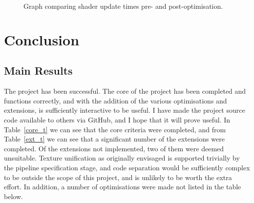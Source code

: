 \documentclass[12pt,twoside,notitlepage]{report}
\begin{document}
\begin{figure}
\centering
{}
\caption{Graph comparing shader update times pre- and post-optimisation.\label{msd-graph}}
\end{figure}

\cleardoublepage
\chapter{Conclusion}

\section{Main Results}
The project has been successful. The core of the project has been completed and functions correctly, and with the addition of the various optimisations and extensions, is sufficiently interactive to be useful. I have made the project source code available to others via GitHub, and I hope that it will prove useful. In Table~\ref{core_t} we can see that the core criteria were completed, and from Table~\ref{ext_t} we can see that a significant number of the extensions were completed. Of the extensions not implemented, two of them were deemed unsuitable. Texture unification as originally envisaged is supported trivially by the pipeline specification stage, and code separation would be sufficiently complex to be outside the scope of this project, and is unlikely to be worth the extra effort. In addition, a number of optimisations were made not listed in the table below.
\end{document}
